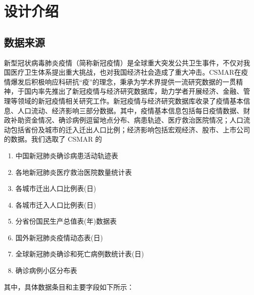 \documentclass{ctexart}
\begin{document}
\section{设计介绍}
\subsection{数据来源}

​		新型冠状病毒肺炎疫情（简称新冠疫情）是全球重大突发公共卫生事件，不仅对我国医疗卫生体系提出重大挑战，也对我国经济社会造成了重大冲击。CSMAR在疫情爆发后积极响应科研抗“疫”的理念，秉承为学术界提供一流研究数据的一贯精神，于国内率先推出了新冠疫情与经济研究数据库，助力学者开展经济、金融、管理等领域的新冠疫情相关研究工作。新冠疫情与经济研究数据库收录了疫情基本信息、人口流动、经济影响三部分数据。其中，疫情基本信息包括每日疫情数据、财政补助资金情况、确诊病例逗留地点分布、病患轨迹、医疗救治医院情况；人口流动包括省份及城市的迁入迁出人口比例；经济影响包括宏观经济、股市、上市公司的数据。
​		我们选取了 CSMAR 的
\begin{enumerate}
    \item 中国新冠肺炎确诊病患活动轨迹表
    \item 各地新冠肺炎医疗救治医院数量统计表
    \item 各城市迁出人口比例表(日)
    \item 各城市迁入人口比例表(日)
    \item 分省份国民生产总值表(年)数据表
    \item 国外新冠肺炎疫情动态表(日)
    \item 全球新冠肺炎确诊和死亡病例数统计表(日)
    \item 确诊病例小区分布表
\end{enumerate}

其中，具体数据条目和主要字段如下所示：
\end{document}
